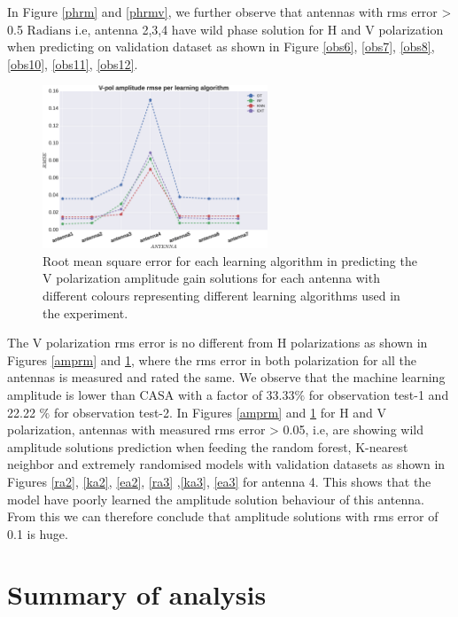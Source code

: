 In Figure \ref{phrm} and \ref{phrmv}, we further observe that antennas with rms error > 0.5 $\mathrm{Radians}$ i.e, antenna 2,3,4 have wild phase solution for H and V polarization when predicting on validation dataset as shown in Figure \ref{obs6}, \ref{obs7}, \ref{obs8},\ref{obs10}, \ref{obs11}, \ref{obs12}. 
\begin{figure}[H]
  \centering
    \includegraphics[width=0.6\textwidth]{images/Vpol-amp.eps}
    \caption{Root mean square error for each learning algorithm in predicting the V polarization amplitude gain solutions for each antenna with different colours representing different learning algorithms used in the experiment.}
  \label{amprmv}
 \end{figure} 

The V polarization rms error is no different from H polarizations as shown in Figures \ref{amprm} and \ref{amprmv}, where the rms error in both polarization for all the antennas is measured and rated the same. We observe that the machine learning amplitude is lower than CASA with a factor of 33.33$\%$ for observation test-1 and 22.22 $\%$ for observation test-2. In Figures \ref{amprm} and \ref{amprmv} for H and V polarization, antennas with measured rms error > 0.05, i.e, are showing wild amplitude solutions prediction when feeding the random forest, K-nearest neighbor and extremely randomised models with validation datasets as shown in Figures  \ref{ra2}, \ref{ka2}, \ref{ea2}, \ref{ra3} ,\ref{ka3}, \ref{ea3} for antenna 4. This shows that the model have poorly learned the amplitude solution behaviour of this antenna. From this we can therefore conclude that amplitude solutions with rms error of 0.1 is huge.

\section{Summary of analysis}

